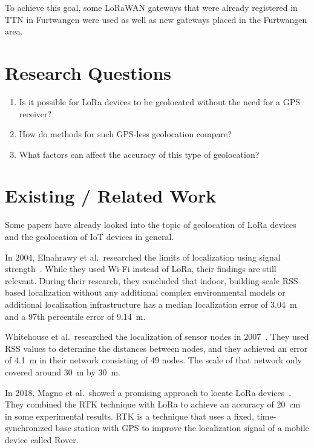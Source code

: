 To achieve this goal, some \ac{LoRaWAN} gateways that were already registered in \acf{TTN} in Furtwangen were used as well as new gateways placed in the Furtwangen area.

\section{Research Questions}\label{sec:introduction-research-questions}

\begin{enumerate}
      \item Is it possible for \ac{LoRa} devices to be geolocated without the need for a \ac{GPS} receiver?
      \item How do methods for such \ac{GPS}-less geolocation compare?
      \item What factors can affect the accuracy of this type of geolocation?
\end{enumerate}

\section{Existing / Related Work}\label{sec:related-work}

Some papers have already looked into the topic of geolocation of \ac{LoRa} devices and the geolocation of \ac{IoT} devices in general.

In 2004, Elnahrawy et al.\ researched the limits of localization using signal strength~\cite{elnahrawy_limits_2004}.
While they used Wi-Fi instead of \ac{LoRa}, their findings are still relevant.
During their research, they concluded that indoor, building-scale \ac{RSS}-based localization without any additional complex environmental models or additional localization infrastructure has a median localization error of \SI{3.04}{\meter} and a 97th percentile error of \SI{9.14}{\meter}.

Whitehouse et al.\ researched the localization of sensor nodes in 2007~\cite{whitehouse_practical_2007}.
They used \ac{RSS} values to determine the distances between nodes, and they achieved an error of \SI{4.1}{\meter} in their network consisting of 49 nodes.
The scale of that network only covered around \SI{30}{\meter} by \SI{30}{\meter}.

In 2018, Magno et al.\ showed a promising approach to locate \ac{LoRa} devices~\cite{magno_poster_2018}.
They combined the \acf{RTK} technique with \ac{LoRa} to achieve an accuracy of \SI{20}{\centi\meter} in some experimental results.
\ac{RTK} is a technique that uses a fixed, time-synchronized base station with \ac{GPS} to improve the localization signal of a mobile device called Rover.

